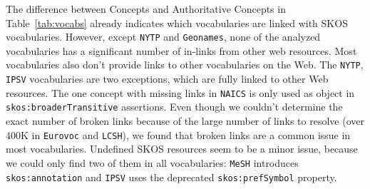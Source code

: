 
The difference between Concepts and Authoritative Concepts in Table~\ref{tab:vocabs} already indicates which vocabularies are linked with SKOS vocabularies.
However, except \texttt{NYTP} and \texttt{Geonames}, none of the analyzed vocabularies has a significant number of in-links from other web resources.
Most vocabularies also don't provide links to other vocabularies on the Web. The \texttt{NYTP}, \texttt{IPSV} vocabularies are two exceptions, which are fully linked to other Web resources. The one concept with missing links in \texttt{NAICS} is only used as object in \texttt{skos:broaderTransitive} assertions.
Even though we couldn't determine the exact number of broken links because of the large number of links to resolve  (over 400K in \texttt{Eurovoc} and \texttt{LCSH}), we found that broken links are a common issue in most vocabularies.
Undefined SKOS resources seem to be a minor issue, because we could only find two of them in all vocabularies: \texttt{MeSH} introduces \texttt{skos:annotation} and \texttt{IPSV} uses the deprecated \texttt{skos:prefSymbol} property.
